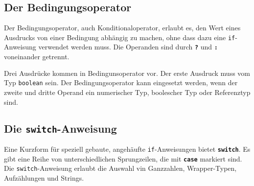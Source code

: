 \subsection{Der Bedingungsoperator}
Der Bedingungsoperator, auch Konditionaloperator, erlaubt es, den Wert eines Ausdrucks von einer Bedingung abhängig zu machen, ohne dass dazu eine \texttt{if}-Anweisung verwendet werden muss. Die Operanden sind durch \textbf{\texttt{?}} und \textbf{\texttt{:}} voneinander getrennt.

Drei Ausdrücke kommen in Bedingunsoperator vor. Der erste Ausdruck muss vom Typ \texttt{boolean} sein. Der Bedingungsoperator kann eingesetzt werden, wenn der zweite und dritte Operand ein numerischer Typ, boolescher Typ oder Referenztyp sind.
\subsection{Die \texttt{switch}-Anweisung}
Eine Kurzform für speziell gebaute, angehäufte \texttt{if}-Anweisungen bietet \textbf{\texttt{switch}}. Es gibt eine Reihe von unterschiedlichen Sprungzeilen, die mit \textbf{\texttt{case}} markiert sind. Die \texttt{switch}-Anweisung erlaubt die Auswahl vin Ganzzahlen, Wrapper-Typen, Aufzählungen und Strings.













